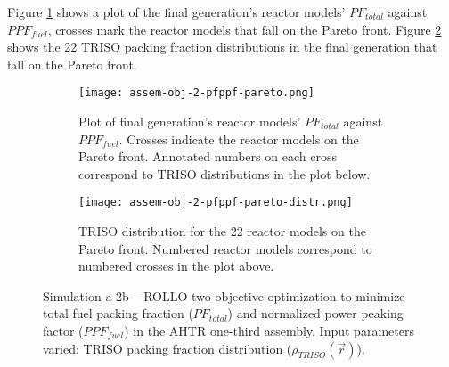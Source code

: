 Figure \ref{fig:assem-obj-2-pfppf-pareto} shows a plot of the final generation's reactor 
models' $PF_{total}$ against $PPF_{fuel}$, crosses mark the reactor models that fall on 
the Pareto front.
Figure \ref{fig:assem-obj-2-pfppf-pareto-distr} shows the 22 TRISO packing fraction 
distributions in the final generation that fall on the Pareto front. 
\begin{figure}[htbp!]
    \centering
    \begin{subfigure}{\textwidth}
        \texttt{[image: assem-obj-2-pfppf-pareto.png]}
        \caption{Plot of final generation's reactor models' $PF_{total}$ against 
        $PPF_{fuel}$. 
        Crosses indicate the reactor models on the Pareto front. Annotated numbers 
        on each cross correspond to TRISO distributions in the plot below.}
        \label{fig:assem-obj-2-pfppf-pareto} 
    \end{subfigure}
    \begin{subfigure}{\textwidth}
        \texttt{[image: assem-obj-2-pfppf-pareto-distr.png]}
        \caption{TRISO distribution for the 22 reactor models on the Pareto front.
        Numbered reactor models correspond to numbered crosses in the plot above. }
        \label{fig:assem-obj-2-pfppf-pareto-distr} 
    \end{subfigure}
    \caption{Simulation a-2b -- ROLLO two-objective optimization to minimize total fuel 
    packing fraction ($PF_{total}$) and normalized power peaking factor ($PPF_{fuel}$) 
    in the \gls{AHTR} one-third assembly. 
    Input parameters varied: TRISO packing fraction distribution 
    ($\rho_{TRISO}(\vec{r})$).}
    \label{fig:assem-obj-2-pfppf}
\end{figure}

